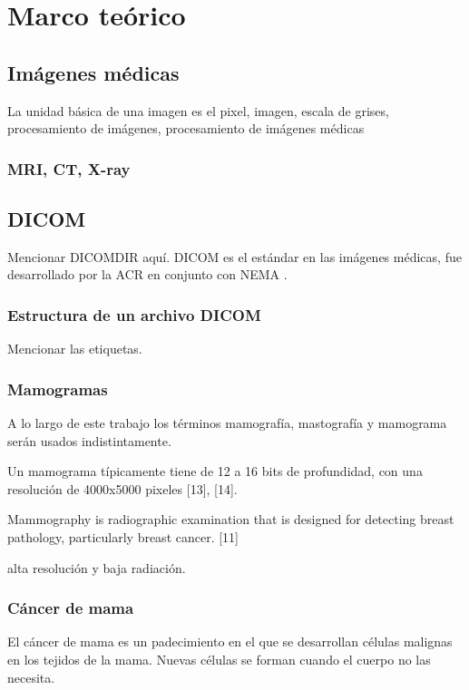 \chapter{Marco teórico}

\section{Imágenes médicas}
La unidad básica de una imagen es el pixel, imagen, escala de grises,
procesamiento de imágenes, procesamiento de imágenes médicas

\subsection{MRI, CT, X-ray}

\section{DICOM}
Mencionar DICOMDIR aquí.
DICOM es el estándar en las imágenes médicas, fue desarrollado por la ACR en
conjunto con NEMA \cite{acrnema, pianykh2011digital}.

\subsection{Estructura de un archivo DICOM}
Mencionar las etiquetas.

\subsection{Mamogramas}
A lo largo de este trabajo los términos mamografía, mastografía y mamograma
serán usados indistintamente. 

Un mamograma típicamente tiene de 12 a 16 bits de profundidad, con una
resolución de 4000x5000 pixeles [13], [14].  

Mammography is radiographic examination that is designed for detecting breast
pathology, particularly breast cancer. [11]

alta resolución y baja radiación.

\subsection{Cáncer de mama} %
El cáncer de mama es un padecimiento en el que se desarrollan células malignas
en los tejidos de la mama. Nuevas células se forman cuando el cuerpo no las
necesita. 

